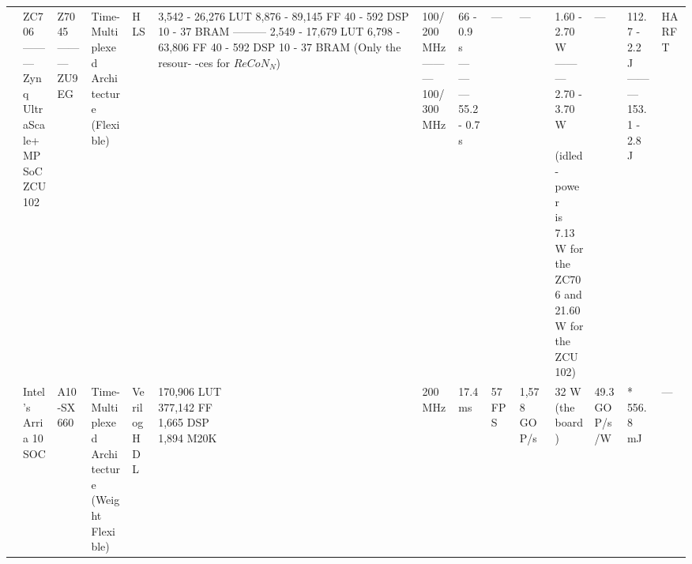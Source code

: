 \begin{center}
{\begin{tabular}{llllllllllllll}
\cite{sabogalReCoNReconfigurableCNN2019} & \makecell[tl]{ZC706\\ ---------\\ Zynq\\ UltraScale+\\ MPSoC\\ ZCU102} & \makecell[tl]{Z7045\\ ---------\\ ZU9EG} & \makecell[tl]{Time-Multiplexed\\ Architecture\\ (Flexible)} & HLS & \makecell[tl]{3,542 - 26,276 LUT\\ 8,876 - 89,145 FF\\ 40 - 592 DSP\\ 10 - 37 BRAM\\ ---------\\ 2,549 - 17,679 LUT\\ 6,798 - 63,806 FF\\ 40 - 592 DSP\\ 10 - 37 BRAM\\ \\ (Only the resour-\\-ces for $ReCoN_N$)} & \makecell[tl]{100/200 MHz\\ ---------\\ 100/300 MHz} & \makecell[tl]{66 - 0.9 s\\ ---------\\ 55.2 - 0.7 s} & --- & --- & \makecell[tl]{1.60 - 2.70 W\\ ---------\\ 2.70 - 3.70 W\\ \\ (idled-power\\ is 7.13W for the\\ ZC706 and\\ 21.60W for the\\ ZCU102)} & --- & \makecell[tl]{112.7 - 2.2 J\\ ---------\\ 153.1 - 2.8 J} & \makecell[tl]{HARFT\\\cite{wilsonHybridAdaptiveReconfigurable2017}} \\
\cite{liuEfficientAcceleratorDNNBased2019} & \makecell[tl]{Intel's\\ Arria 10\\ SOC} & A10-SX 660 & \makecell[tl]{Time-Multiplexed\\ Architecture\\ (Weight Flexible)} & \makecell[tl]{Verilog\\ HDL} & \makecell[tl]{170,906 LUT\\ 377,142 FF\\ 1,665 DSP\\ 1,894 M20K} & 200 MHz & 17.4 ms & 57 FPS & 1,578 GOP/s & \makecell[tl]{32 W\\ (the board)} & \makecell[tl]{49.3\\ GOP/s/W} & * 556.8 mJ & --- \\ \hline

\end{tabular}}
\end{center}
